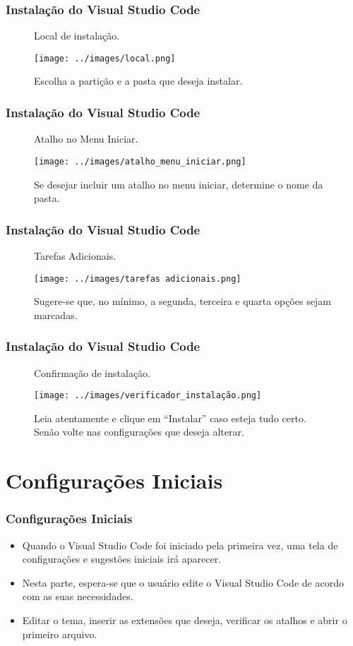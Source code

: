 \documentclass{beamer}
\begin{document}
\begin{frame}
    \frametitle{Instalação do Visual Studio Code}
\begin{figure}[h]
    \centering
    \caption{Local de instalação.}
    \label{fig:local}
    \texttt{[image: ../images/local.png]}
    \caption*{\footnotesize Escolha a partição e a pasta que deseja instalar.}
\end{figure}
\end{frame}

\begin{frame}
    \frametitle{Instalação do Visual Studio Code}
\begin{figure}[h]
    \centering
    \caption{Atalho no Menu Iniciar.}
    \label{fig:atalho_menu_iniciar}
    \texttt{[image: ../images/atalho\_menu\_iniciar.png]}
    \caption*{\footnotesize Se desejar incluir um atalho no menu iniciar, determine o nome da pasta.}
\end{figure}
\end{frame}

\begin{frame}
    \frametitle{Instalação do Visual Studio Code}
\begin{figure}[h]
    \centering
    \caption{Tarefas Adicionais.}
    \label{fig:tarefas_adicionais}
    \texttt{[image: ../images/tarefas adicionais.png]}
    \caption*{\footnotesize Sugere-se que, no mínimo, a segunda, terceira e quarta opções sejam marcadas.}
\end{figure}
\end{frame}

\begin{frame}
    \frametitle{Instalação do Visual Studio Code}
\begin{figure}[h]
    \centering
    \caption{Confirmação de instalação.}
    \label{fig:verificador_instalacao}
    \texttt{[image: ../images/verificador\_instalação.png]}
    \caption*{\footnotesize Leia atentamente e clique em ``Instalar'' caso esteja tudo certo. Senão volte nas configurações que deseja alterar.}
\end{figure}
\end{frame}

\section{Configurações Iniciais}
\begin{frame}
    \frametitle{Configurações Iniciais}
\begin{itemize}
    \item Quando o Visual Studio Code foi iniciado pela primeira vez, uma tela de configurações e sugestões iniciais irá aparecer. 
    \item Nesta parte, espera-se que o usuário edite o Visual Studio Code de acordo com as suas necessidades.
    \item Editar o tema, inserir as extensões que deseja, verificar os atalhos e abrir o primeiro arquivo.
\end{itemize}
\end{frame}
\end{document}

